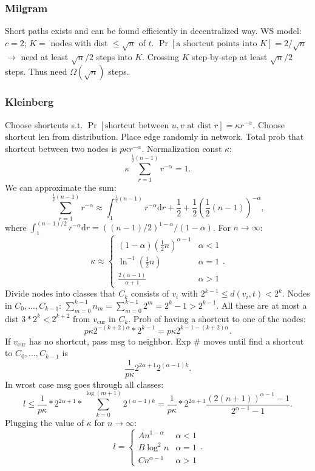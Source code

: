 \documentclass[a4paper,twocolumn,10pt]{article}
\newcommand{\pte}[1]{\left({#1}\right)}
\newcommand{\dd}{\mathrm{d}}
\begin{document}
	\subsubsection{Milgram}
		Short paths exists and can be found efficiently in decentralized way.
		WS model: $c=2$; $K=$ nodes with dist $\le\sqrt{n}$ of $t$.
		$\Pr[\textrm{a shortcut points into $K$}]=2/\sqrt{n}$
			$\to$ need at least $\sqrt{n}/2$ steps into $K$.
		Crossing $K$ step-by-step at least $\sqrt{n}/2$ steps.
		Thus need $\Omega(\sqrt n)$ steps.
	
	\subsubsection{Kleinberg}
		Choose shortcuts s.t.
			$\Pr[\textrm{shortcut between $u,v$ at dist $r$}]=\kappa r^{-\alpha}$.
		Choose shortcut len from distribution.
		Place edge randomly in network.
		Total prob that shortcut between two nodes is $p\kappa r^{-\alpha}$.
		Normalization const $\kappa$:
		\[
			\kappa\sum_{r = 1}^{\frac{1}{2}(n - 1)}r^{-\alpha} = 1.
		\]
		We can approximate the sum:
		\[
			\sum\limits_{r= 1}^{\frac{1}{2}(n - 1)} r^{-\alpha}
			\approx\int_{1}^{\frac{1}{2}(n - 1)} r^{-\alpha}\dd r
			+\frac{1}{2}+\frac{1}{2}\pte{\frac{1}{2}(n - 1)}^{-\alpha},
		\]
		where $\int_{1}^{(n - 1)/2} r^{-\alpha}\dd r=((n-1)/2)^{1-\alpha}/(1-\alpha)$.
		For $n\to\infty$:
		\[
			\kappa\approx\left\{\begin{array}{ll}
				(1-\alpha)(\frac{1}{2}n)^{\alpha - 1} &\alpha<1\\
				\ln^{-1}(\frac{1}{2}n) &\alpha = 1\\
				\frac{2(\alpha-1)}{\alpha+1} &\alpha>1
			\end{array}\right..
		\]
		Divide nodes into classes that $C_k$ consists of $v_i$ with
			$2^{k-1}\le d(v_i,t)<2^k$.
		Nodes in $C_0,...,C_{k-1}$:
			$\sum_{m=0}^{k-1}n_m = \sum_{m=0}^{k-1}2^m = 2^k-1 > 2^{k-1}$.
		All these are at most a dist $3 * 2^k < 2^{k+2}$ from $v_{\mathrm{cur}}$ in $C_k$.
		Prob of having a shortcut to one of the nodes:
		\[
			p\kappa 2^{-(k+2)\alpha}*2^{k-1}=p\kappa 2^{k-1-(k+2)\alpha}.
		\]
                If $v_{\mathrm{cur}}$ has no shortcut, pass msg to neighbor.
		Exp $\#$ moves until find a shortcut to $C_0,...,C_{k-1}$ is 
		\[
			\frac{1}{p\kappa} 2^{2\alpha+1} 2^{(\alpha-1)k}.
		\]
		In wrost case msg goes through all classes:
		\[
			l \le \frac{1}{p\kappa}*2^{2\alpha+1}*
				\sum_{k=0}^{\log(m+1)}2^{(\alpha-1)k}
			= \frac{1}{p\kappa}*2^{2\alpha+1}
				\frac{(2(n+1))^{\alpha-1}-1}{2^{\alpha-1}-1}.
		\]
		Plugging the value of $\kappa$ for $n\to\infty$:
		\[
			l=\left\{\begin{array}{ll}
				A n^{1-\alpha} &\alpha<1\\
				B \log^2 n &\alpha = 1\\
				C n^{\alpha-1} &\alpha>1
			\end{array}\right..
		\]
\end{document}
